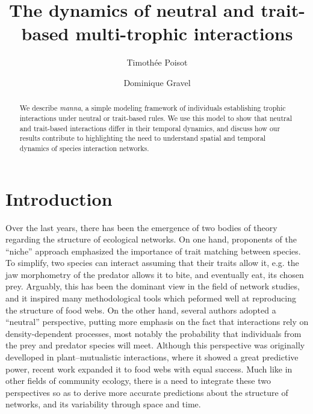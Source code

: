 \documentclass[10pt,twocolumn,fleqn]{article}
\title{The dynamics of neutral and trait-based multi-trophic interactions}
\date{}
\author[1,2]{Timoth\'ee Poisot}
\author[1,2]{Dominique Gravel}
\affil[1]{Universit\'e du Qu\'ebec \`a Rimouski, Rimouski, Canada.}
\affil[2]{Quebec Centre for Biodiversity Science, McGill University, Montr\'eal, Canada.}
\affil[*]{email: \texttt{timothee.poisot@uqar.ca}}
\begin{document}
\maketitle

\begin{abstract}
We describe \emph{manna}, a simple modeling framework of individuals
establishing trophic interactions under neutral or trait-based rules. We use
this model to show that neutral and trait-based interactions differ in their
temporal dynamics, and discuss how our results contribute to highlighting the
need to understand spatial and temporal dynamics of species interaction
networks.
\end{abstract}

\section{Introduction}

Over the last years, there has been the emergence of two bodies of theory
regarding the structure of ecological networks. On one hand, proponents of the
``niche'' approach emphasized the importance of trait matching between species.
To simplify, two species can interact assuming that their traits allow it, e.g.
the jaw morphometry of the predator allows it to bite, and eventually eat,
its chosen prey. Arguably, this has been the dominant view in the field of
network studies, and it inspired many methodological tools which peformed well
at reproducing the structure of food webs. On the other hand, several authors
adopted a ``neutral'' perspective, putting more emphasis on the fact that
interactions rely on density-dependent processes, most notably the probability
that individuals from the prey and predator species will meet. Although this
perspective was originally develloped in plant--mutualistic interactions, where
it showed a great predictive power, recent work expanded it to food webs with
equal success. Much like in other fields of community ecology, there is a need
to integrate these two perspectives so as to derive more accurate predictions
about the structure of networks, and its variability through space and time.
\end{document}
